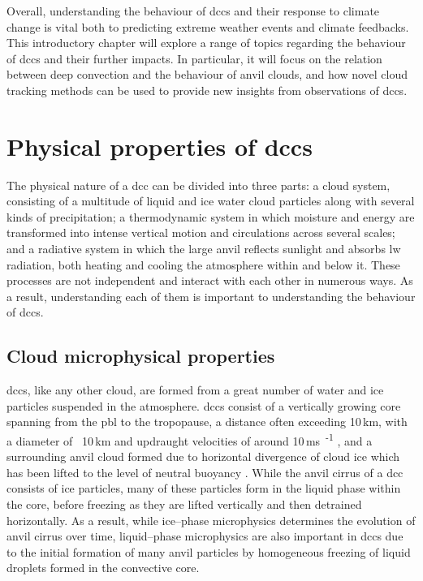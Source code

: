 Overall, understanding the behaviour of \acrshort{dcc}s and their response to climate change is vital both to predicting extreme weather events and climate feedbacks.
This introductory chapter will explore a range of topics regarding the behaviour of \acrshort{dcc}s and their further impacts.
In particular, it will focus on the relation between deep convection and the behaviour of anvil clouds, and how novel cloud tracking methods can be used to provide new insights from observations of \acrshort{dcc}s.


\section{Physical properties of \acrshort{dcc}s}

The physical nature of a \acrshort{dcc} can be divided into three parts: a cloud system, consisting of a multitude of liquid and ice water cloud particles along with several kinds of precipitation; a thermodynamic system in which moisture and energy are transformed into intense vertical motion and circulations across several scales; and a radiative system in which the large anvil reflects sunlight and absorbs \acrshort{lw} radiation, both heating and cooling the atmosphere within and below it.
These processes are not independent and interact with each other in numerous ways.
As a result, understanding each of them is important to understanding the behaviour of \acrshort{dcc}s.


\subsection{Cloud microphysical properties}

\acrshort{dcc}s, like any other cloud, are formed from a great number of water and ice particles suspended in the atmosphere.
\acrshort{dcc}s consist of a vertically growing core spanning from the \acrfull{pbl} to the tropopause, a distance often exceeding 10\,\unit{km}, with a diameter of ~10\,\unit{km} and updraught velocities of around 10\,\unit{ms\textsuperscript{-1}} \citep{weisman_mesoscale_2015}, and a surrounding anvil cloud formed due to horizontal divergence of cloud ice which has been lifted to the level of neutral buoyancy \citep{houze_chapter_2014}.
While the anvil cirrus of a \acrshort{dcc} consists of ice particles, many of these particles form in the liquid phase within the core, before freezing as they are lifted vertically and then detrained horizontally.
As a result, while ice--phase microphysics determines the evolution of anvil cirrus over time, liquid--phase microphysics are also important in \acrshort{dcc}s due to the initial formation of many anvil particles by homogeneous freezing of liquid droplets formed in the convective core.

